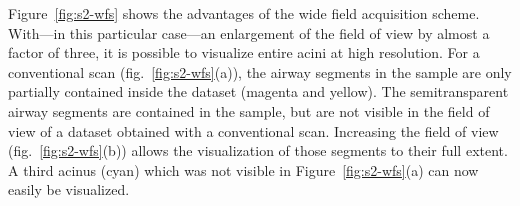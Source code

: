 Figure~\ref{fig:s2-wfs} shows the advantages of the wide field acquisition scheme. With---in this particular case---an enlargement of the field of view by almost a factor of three, it is possible to visualize entire acini at high resolution. For a conventional scan (fig.~\ref{fig:s2-wfs}(a)), the airway segments in the sample are only partially contained inside the dataset (magenta and yellow). The semitransparent airway segments are contained in the sample, but are not visible in the field of view of a dataset obtained with a conventional scan. Increasing the field of view (fig.~\ref{fig:s2-wfs}(b)) allows the visualization of those segments to their full extent. A third acinus (cyan) which was not visible in Figure~\ref{fig:s2-wfs}(a) can now easily be visualized.

\renewcommand{\imsize}{.725\linewidth}%
